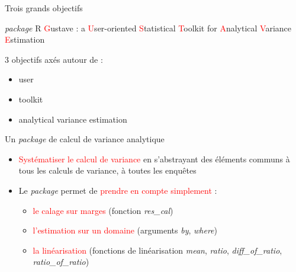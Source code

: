 \documentclass[xcolor=dvipsnames]{beamer}
\begin{document}
\begin{frame}{Trois grands objectifs}

\textit{package} R \textcolor{red}{G}ustave : a \textcolor{red}{U}ser-oriented \textcolor{red}{S}tatistical \textcolor{red}{T}oolkit for \textcolor{red}{A}nalytical \textcolor{red}{V}ariance \textcolor{red}{E}stimation

\vspace{0.5 cm}

3 objectifs axés autour de :
\vspace{0.3 cm}

\begin{itemize}
    \item user
    \vspace{0.3 cm}
    \item toolkit
    \vspace{0.3 cm}
    \item analytical variance estimation
\end{itemize}

\end{frame}

\begin{frame}{Un \textit{package} de calcul de variance analytique}
\begin{itemize}
    \item \textcolor{red}{Systématiser le calcul de variance} en s'abstrayant des éléments communs à tous les calculs de variance, à toutes les enquêtes
    \vspace{0.5cm}
    \item Le \textit{package} permet de \textcolor{red}{prendre en compte simplement} :
    \vspace{0.2 cm}
    \begin{itemize}
        \item \textcolor{red}{le calage sur marges} (fonction \textit{res\_cal})
        \vspace{0.2 cm}
        \item \textcolor{red}{l'estimation sur un domaine} (arguments \textit{by}, \textit{where})
        \vspace{0.2 cm}
        \item \textcolor{red}{la linéarisation} (fonctions de linéarisation \textit{mean}, \textit{ratio}, \textit{diff\_of\_ratio},  \textit{ratio\_of\_ratio})
    \end{itemize}
\end{itemize}
\end{frame}
\end{document}
